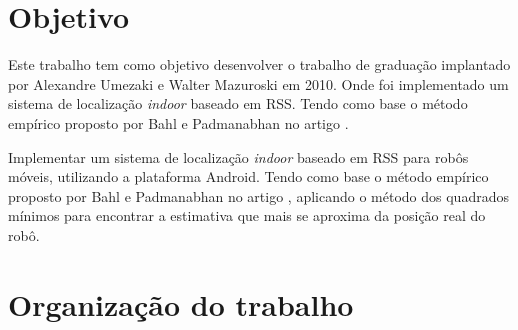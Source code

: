 \clearpage
\section{Objetivo}
  Este trabalho tem como objetivo desenvolver o trabalho de graduação 
  implantado por Alexandre Umezaki e Walter Mazuroski em 2010. Onde foi implementado um sistema de localização
   \textit{indoor} baseado em RSS. Tendo como base o 
  método empírico proposto por Bahl e Padmanabhan no artigo \cite{wifiRadar}. 
  
  
  Implementar um sistema de localização \textit{indoor} baseado em RSS para robôs móveis, 
  utilizando a plataforma Android. Tendo como base o 
  método empírico proposto por Bahl e Padmanabhan no artigo \cite{wifiRadar}, 
  aplicando o método dos quadrados mínimos para encontrar a estimativa que mais 
  se aproxima da posição real do robô.
  
\begin{comment}
    O objetivo deste trabalho é implementar um sistema de navegação para robôs móveis em ambientes dinâmicos, utilizando as plataformas Android e Arduino. 
    E no mesmo, apresentar uma solução para os problemas de construção e atualização de mapas, localização e planejamento de caminhos.
    
    Método de representação de mapas utilizado nesse trabalho será similar ao proposto em \cite{cnn}, onde o mapa é um \textit{grid},
    no qual cada célula um valor, que indica o grau de incerteza de haver um obstáculo. O mapa será construído a partir de uma imagem, ela
    será dividida em células, em cada célula será aplicada a função de transformação de Hough\cite{openCV}, e assim será atribuido um valor a célula. A atualização do 
    mapa será feita através das informações coletadas pelo sonar do robô.
    
    Nesse trabalho para fazer a localização do robô será implementado o metodo empírico sugerido no artigo\cite{wifiRadar}, 
	o método é parte de uma técnica de localização baseada em RSS, a qual é uma característica 
	do sinal transmitido, muito utilizada em técnicas de localização por não demandar \textit{hardware} extra.
	
    O planejamento de trajeto do robô será feito aplicando o algoritmo A*\cite{aestrela} no grafo do mapa topológico.
\end{comment}

\section{Organização do trabalho}

